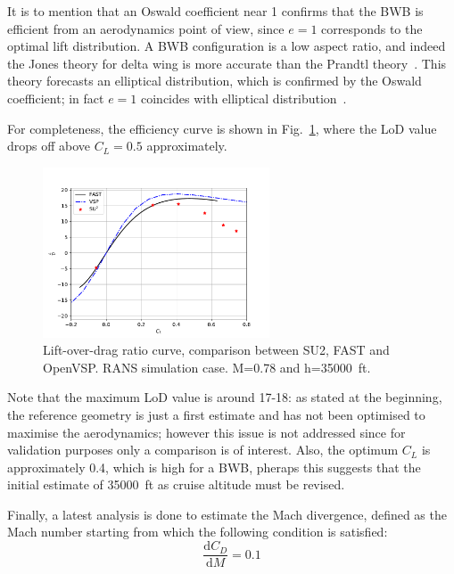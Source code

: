 It is to mention that an Oswald coefficient near 1 confirms that the BWB is efficient from an aerodynamics point of view, since $e=1$ corresponds to the optimal lift distribution. 
A BWB configuration is a low aspect ratio, and indeed the Jones theory for delta wing is more accurate than the Prandtl theory~\cite{bib:cdn_notes}. 
This theory forecasts an elliptical distribution, which is confirmed by the Oswald coefficient; in fact $e=1$ coincides with elliptical distribution~\cite{bib:anderson_aero}.

For completeness, the efficiency curve is shown in Fig.~\ref{fig:l2d_rans}, where the LoD value drops off above $C_L=0.5$ approximately. 
\begin{figure}[!h]
	\centering
	\includegraphics[keepaspectratio, width=0.6\textwidth]{images/chap4/l2d_rans}
	\caption{Lift-over-drag ratio curve, comparison between SU2, FAST and OpenVSP. RANS simulation case. M=0.78 and h=35000~ft.}
	\label{fig:l2d_rans}
\end{figure}
Note that the maximum LoD value is around 17-18: as stated at the beginning, the reference geometry is just a first estimate and has not been optimised to maximise the aerodynamics; however this issue is not addressed since for validation purposes only a comparison is of interest. 
Also, the optimum $C_L$ is approximately 0.4, which is high for a BWB, pheraps this suggests that the initial estimate of 35000~ft as cruise altitude must be revised. 

Finally, a latest analysis is done to estimate the Mach divergence, defined as the Mach number starting from which the following condition is satisfied:
\begin{equation}
	\label{eq:mach_divergence}
	\frac{\textrm{d}C_D}{\textrm{d}M}=0.1
\end{equation}

